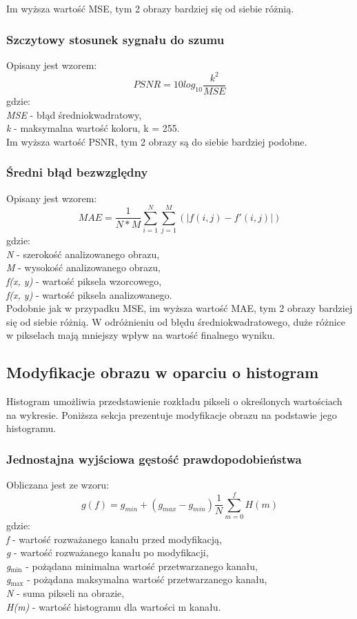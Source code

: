 \documentclass{classrep}
\begin{document}
Im wyższa wartość MSE, tym 2 obrazy bardziej się od siebie różnią.
\subsubsection{Szczytowy stosunek sygnału do szumu}
Opisany jest wzorem:
\[ PSNR = 10  log_{10} \frac{k^2}{MSE} \]
gdzie:\\
\textit{MSE} - błąd średniokwadratowy,\\
\textit{k} - maksymalna wartość koloru, k = 255.\\

Im wyższa wartość PSNR, tym 2 obrazy są do siebie bardziej podobne.
\subsubsection{Średni błąd bezwzględny}
Opisany jest wzorem:
\[ MAE = \frac{1}{N \ast M} \sum_{i=1}^{N} \sum_{j=1}^{M} (|f(i, j) - f'(i, j)|)\]
gdzie:\\
\textit{N} - szerokość analizowanego obrazu,\\
\textit{M} - wysokość analizowanego obrazu,\\
\textit{f(x, y)} - wartość piksela wzorcowego,\\
\textit{f(x, y)} - wartość piksela analizowanego.\\

Podobnie jak w przypadku MSE, im wyższa wartość MAE, tym 2 obrazy bardziej się od siebie różnią. W odróżnieniu od błędu średniokwadratowego, duże różnice w pikselach mają mniejszy wpływ na wartość finalnego wyniku.

\subsection{Modyfikacje obrazu w oparciu o histogram}
Histogram umożliwia przedstawienie rozkładu pikseli o określonych wartościach na wykresie. Poniższa sekcja prezentuje modyfikacje obrazu na podstawie jego histogramu.

\subsubsection{Jednostajna wyjściowa gęstość prawdopodobieństwa}
Obliczana jest ze wzoru:
\[ g(f) = g_{min} + (g_{max} - g_{min}) \frac{1}{N} \displaystyle\sum_{m=0}^{f} H(m) \]
gdzie:\\
\textit{f} - wartość rozważanego kanału przed modyfikacją,\\
\textit{g} - wartość rozważanego kanału po modyfikacji,\\
\textit{g$_{\text{min}}$} - pożądana minimalna wartość przetwarzanego kanału,\\
\textit{g$_{\text{max}}$} - pożądana maksymalna wartość przetwarzanego kanału,\\
\textit{N} - suma pikseli na obrazie,\\
\textit{H(m)} - wartość histogramu dla wartości m kanału.\\
\end{document}
